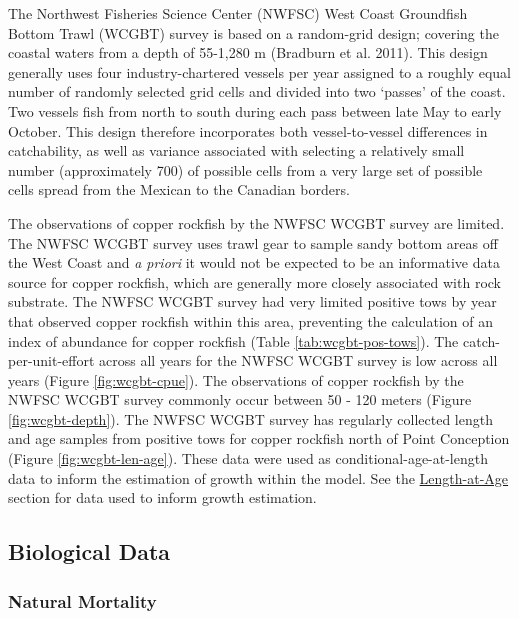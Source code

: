 \documentclass[11pt,
  english,
  letterpaper,
]{article}
\begin{document}
The Northwest Fisheries Science Center (NWFSC) West Coast Groundfish Bottom Trawl (WCGBT) survey is based on a random-grid design; covering the coastal waters from a depth of 55-1,280 m (Bradburn et al. 2011). This design generally uses four industry-chartered vessels per year assigned to a roughly equal number of randomly selected grid cells and divided into two `passes' of the coast. Two vessels fish from north to south during each pass between late May to early October. This design therefore incorporates both vessel-to-vessel differences in catchability, as well as variance associated with selecting a relatively small number (approximately 700) of possible cells from a very large set of possible cells spread from the Mexican to the Canadian borders.

The observations of copper rockfish by the NWFSC WCGBT survey are limited. The NWFSC WCGBT survey uses trawl gear to sample sandy bottom areas off the West Coast and \emph{a priori} it would not be expected to be an informative data source for copper rockfish, which are generally more closely associated with rock substrate. The NWFSC WCGBT survey had very limited positive tows by year that observed copper rockfish within this area, preventing the calculation of an index of abundance for copper rockfish (Table \ref{tab:wcgbt-pos-tows}). The catch-per-unit-effort across all years for the NWFSC WCGBT survey is low across all years (Figure \ref{fig:wcgbt-cpue}). The observations of copper rockfish by the NWFSC WCGBT survey commonly occur between 50 - 120 meters (Figure \ref{fig:wcgbt-depth}). The NWFSC WCGBT survey has regularly collected length and age samples from positive tows for copper rockfish north of Point Conception (Figure \ref{fig:wcgbt-len-age}). These data were used as conditional-age-at-length data to inform the estimation of growth within the model. See the \protect\hyperlink{length-at-age}{Length-at-Age} section for data used to inform growth estimation.

\hypertarget{biological-data}{%
\subsection{Biological Data}\label{biological-data}}

\hypertarget{natural-mortality}{%
\subsubsection{Natural Mortality}\label{natural-mortality}}
\end{document}
